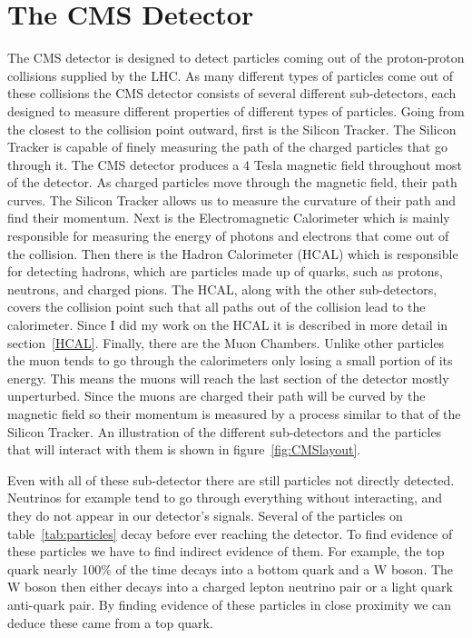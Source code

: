 \section{The CMS Detector}
The CMS detector is designed to detect particles coming out of the proton-proton collisions supplied by the LHC. As many different types of particles come out of these collisions the CMS detector consists of several different sub-detectors, each designed to measure different properties of different types of particles. Going from the closest to the collision point outward, first is the Silicon Tracker. The Silicon Tracker is capable of finely measuring the path of the charged particles that go through it. The CMS detector produces a 4 Tesla magnetic field throughout most of the detector. As charged particles move through the magnetic field, their path curves. The Silicon Tracker allows us to measure the curvature of their path and find their momentum. Next is the Electromagnetic Calorimeter which is mainly responsible for measuring the energy of photons and electrons that come out of the collision. Then there is the Hadron Calorimeter (HCAL) which is responsible for detecting hadrons, which are particles made up of quarks, such as protons, neutrons, and charged pions. The HCAL, along with the other sub-detectors, covers the collision point such that all paths out of the collision lead to the calorimeter. Since I did my work on the HCAL it is described in more detail in section~\ref{HCAL}. Finally, there are the Muon Chambers. Unlike other particles the muon tends to go through the calorimeters only losing a small portion of its energy. This means the muons will reach the last section of the detector mostly unperturbed. Since the muons are charged their path will be curved by the magnetic field so their momentum is measured by a process similar to that of the Silicon Tracker. An illustration of the different sub-detectors and the particles that will interact with them is shown in figure~\ref{fig:CMSlayout}.

Even with all of these sub-detector there are still particles not directly detected. Neutrinos for example tend to go through everything without interacting, and they do not appear in our detector's signals. Several of the particles on table~\ref{tab:particles} decay before ever reaching the detector. To find evidence of these particles we have to find indirect evidence of them. For example, the top quark nearly 100\% of the time decays into a bottom quark and a W boson. The W boson then either decays into a charged lepton neutrino pair or a light quark anti-quark pair. By finding evidence of these particles in close proximity we can deduce these came from a top quark.


